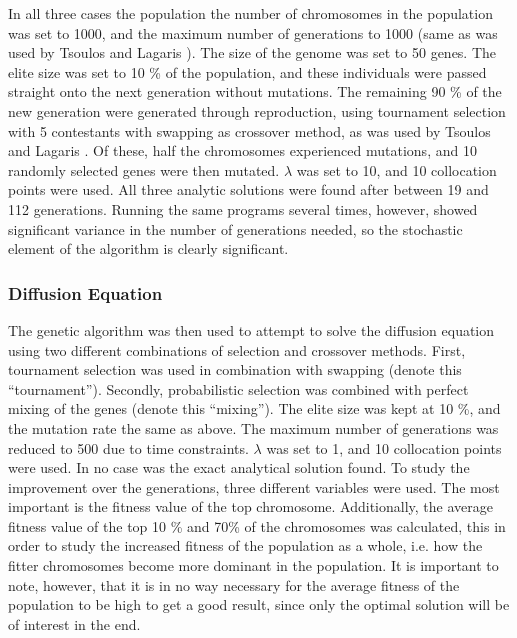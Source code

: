 \documentclass[multicolumn, 9pt]{extarticle}
\begin{document}
In all three cases the population the number of chromosomes in the population was set to 1000, and the maximum number of generations to 1000 (same as was used by Tsoulos and Lagaris \cite{Lagaris}). The size of the genome was set to 50 genes. The elite size was set to 10 \% of the population, and these individuals were passed straight onto the next generation without mutations. The remaining 90 \% of the new generation were generated through reproduction, using tournament selection with 5 contestants with swapping as crossover method, as was used by Tsoulos and Lagaris \cite{Lagaris}. Of these, half the chromosomes experienced mutations, and 10 randomly selected genes were then mutated. $\lambda$ was set to 10, and 10 collocation points were used. All three analytic solutions were found after between 19 and 112 generations. Running the same programs several times, however, showed significant variance in the number of generations needed, so the stochastic element of the algorithm is clearly significant.

\subsubsection{Diffusion Equation}
The genetic algorithm was then used to attempt to solve the diffusion equation using two different combinations of selection and crossover methods. First, tournament selection was used in combination with swapping (denote this ``tournament''). Secondly, probabilistic selection was combined with perfect mixing of the genes (denote this ``mixing''). The elite size was kept at 10 \%, and the mutation rate the same as above. The maximum number of generations was reduced to 500 due to time constraints. $\lambda$ was set to 1, and 10 collocation points were used. In no case was the exact analytical solution found. To study the improvement over the generations, three different variables were used. The most important is the fitness value of the top chromosome. Additionally, the average fitness value of the top 10 \% and 70\% of the chromosomes was calculated, this in order to study the increased fitness of the population as a whole, i.e. how the fitter chromosomes become more dominant in the population. It is important to note, however, that it is in no way necessary for the average fitness of the population to be high to get a good result, since only the optimal solution will be of interest in the end.
\end{document}
